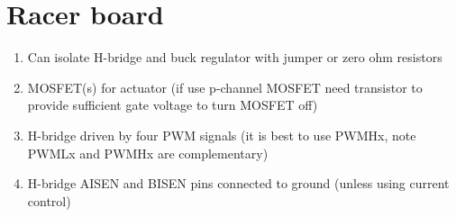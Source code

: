 \documentclass[a4paper, 12pt]{article}
\begin{document}
\section{Racer board}


\begin{enumerate}

\item Can isolate H-bridge and buck regulator with jumper or zero ohm
  resistors

\item MOSFET(s) for actuator (if use p-channel MOSFET need transistor
  to provide sufficient gate voltage to turn MOSFET off)

\item H-bridge driven by four PWM signals (it is best to use PWMHx,
  note PWMLx and PWMHx are complementary)

\item H-bridge AISEN and BISEN pins connected to ground (unless using
  current control)

\end{enumerate}
\end{document}

